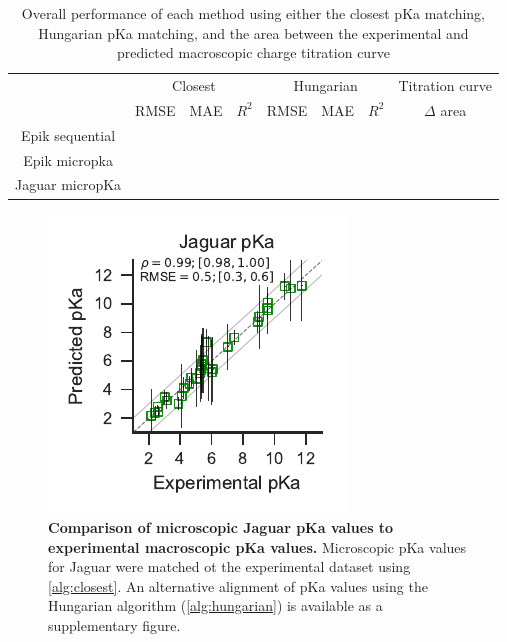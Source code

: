 \documentclass[9pt,lineno,final]{elife}
\begin{document}
\begin{table}[H]
	\centering
	\caption{Overall performance of each method using either the closest pKa matching, Hungarian pKa matching,  and the area between the experimental and predicted macroscopic charge titration curve}
	\label{tab:overview-performance}
	\begin{tabular}{c|ccc|ccc|c}
		& \multicolumn{3}{c|}{Closest} & \multicolumn{3}{c|}{Hungarian} & Titration curve \\ \cline{2-8} 
		                & RMSE & MAE & $R^2$ & RMSE & MAE & $R^2$ & $\Delta $ area \\ \hline
		Epik sequential &      &     &       &      &     &       &           \\
		Epik micropka   &      &     &       &      &     &       &           \\
		Jaguar micropKa &      &     &       &      &     &       &           
	\end{tabular}
\end{table}
    

\begin{figure}[H]
\centering
\includegraphics[]{closest_pka_jaguar.pdf}
\caption{{\bf Comparison of microscopic Jaguar pKa values to experimental macroscopic pKa values.} Microscopic pKa values for Jaguar were matched ot the experimental dataset using \cref{alg:closest}. An alternative alignment of pKa values using the Hungarian algorithm (\cref{alg:hungarian}) is available as a supplementary figure. \label{correlation-closest-jaguar}}

\end{figure}
\end{document}
